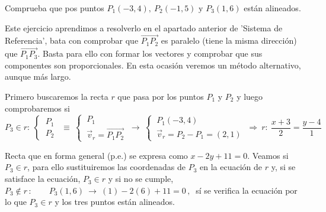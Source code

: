 \vspace{5mm}
\begin{miejemplo}

Comprueba que pos puntos $P_1(-3,4),\ P_2(-1,5)  \text{ y }	 P_3(1,6)$ están alineados.

\vspace{6mm} Este ejercicio aprendimos a resolverlo en el apartado anterior de 'Sistema de Referencia', bata con comprobar que $\overrightarrow{P_1P_2}$ es paralelo (tiene la misma dirección) que $\overrightarrow{P_1P_3}$. Basta para ello con formar los vectores y comprobar que sus componentes son proporcionales. En esta ocasión veremos un método alternativo, aunque más largo.

\vspace{2mm} Primero buscaremos la recta $r$ que pasa por los puntos $P_1$ y $P_2$ y luego comprobaremos si $P_3 \in  r:\ \begin{cases}  \ P_1 \\ \ P_2 \ \end{cases}\ \equiv \ \begin{cases}  \ P_1 \\ \ \vec v_r=\overrightarrow{P_1P_2} \ \end{cases}
 \to \ \begin{cases}  \ P_1(-3,4) \\ \ \vec v_r=P_2-P_1=(2,1) \ \end{cases} \Rightarrow   \ r:\  \dfrac{x+3}{2}=\dfrac{y-4}{1}$

\vspace{2mm} Recta que en forma general (p.e.) se expresa como $x-2y+11=0$. Veamos si $P_3 \in r$, para ello sustituiremos las coordenadas de $P_3$ en la ecuación de $r$ y, si se satisface la ecuación, $P_3 \in r$  y si no se cumple, $P_3 \notin r \, : \qquad P_3(1,6) \ \to \ (1)-2(6)+11 = 0 \, , \ $  sí se verifica la ecuación por lo que $P_3\in r$ y los tres puntos están alineados.
\end{miejemplo}

\vspace{5mm}

